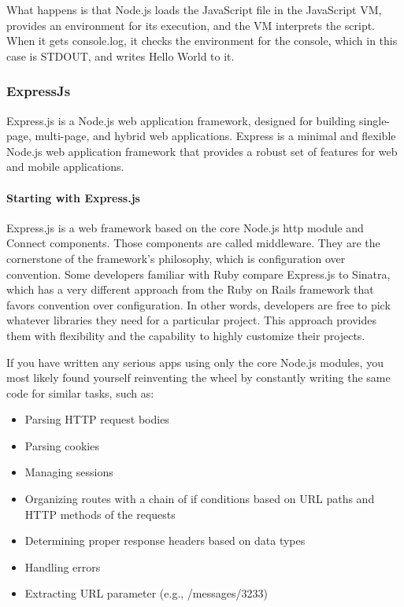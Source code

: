 What happens is that Node.js loads the JavaScript file in the JavaScript VM, provides
an environment for its execution, and the VM interprets the script. When it gets
console.log, it checks the environment for the console, which in this case is STDOUT,
and writes Hello World to it.


\subsubsection{ExpressJs}
Express.js is a Node.js web application framework, designed for building single-page, multi-page, and hybrid web applications.
Express is a minimal and flexible Node.js web application framework that provides a robust set of features for web and mobile applications.
\paragraph*{Starting with Express.js}
\hfill \break
Express.js is a web framework based on the core Node.js http module and Connect components. Those components are called middleware. They are the cornerstone of the framework’s philosophy, which is configuration over convention. Some developers familiar with Ruby compare Express.js to Sinatra, which has a very different approach from the Ruby on Rails framework that favors convention over configuration. In other words, developers are free to pick whatever libraries they need for a particular project. This approach provides them with flexibility and the
capability to highly customize their projects.

If you have written any serious apps using only the core Node.js modules, you most likely found yourself reinventing the wheel by constantly writing the same code for similar tasks, such as:
\begin{itemize}
  \item Parsing HTTP request bodies
  \item Parsing cookies
  \item Managing sessions
  \item Organizing routes with a chain of if conditions based on URL paths and HTTP methods of the
requests
  \item Determining proper response headers based on data types
  \item Handling errors
  \item Extracting URL parameter (e.g., /messages/3233)
\end{itemize}

